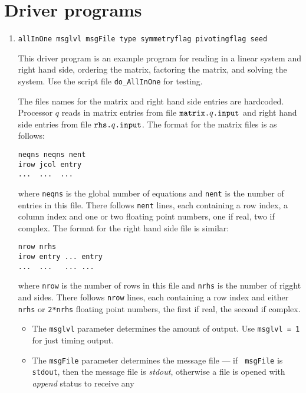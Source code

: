 \par
\section{Driver programs}
\label{section:MPI:drivers}
\par
\begin{enumerate}
\item
\begin{verbatim}
allInOne msglvl msgFile type symmetryflag pivotingflag seed
\end{verbatim}
This driver program is an example program for reading in a linear
system and right hand side, ordering the matrix, 
factoring the matrix, and solving the system.
Use the script file {\tt do\_AllInOne} for testing.
\par
The files names for the matrix and right hand side entries are
hardcoded.
Processor $q$ reads in matrix entries from file 
$\mbox{\tt matrix.}q\mbox{\tt .input}$
and right hand side entries from file
$\mbox{\tt rhs.}q\mbox{\tt .input}$.
The format for the matrix files is as follows:
\begin{verbatim}
neqns neqns nent
irow jcol entry
...  ...  ...
\end{verbatim}
where {\tt neqns} is the global number of equations and {\tt nent}
is the number of entries in this file.
There follows {\tt nent} lines, each containing a row index, a
column index and one or two floating point numbers, one if real,
two if complex.
The format for the right hand side file is similar:
\begin{verbatim}
nrow nrhs
irow entry ... entry
...  ...   ... ...
\end{verbatim}
where {\tt nrow} is the number of rows in this file
and {\tt nrhs} is the number of rigght and sides.
There follows {\tt nrow} lines, each containing a row index
and either {\tt nrhs} or {\tt 2*nrhs} floating point numbers, 
the first if real, the second if complex.
\par
\begin{itemize}
\item
The {\tt msglvl} parameter determines the amount of output.
Use {\tt msglvl = 1} for just timing output.
\item
The {\tt msgFile} parameter determines the message file --- if {\tt
msgFile} is {\tt stdout}, then the message file is {\it stdout},
otherwise a file is opened with {\it append} status to receive any

\end{itemize}
\end{enumerate}
